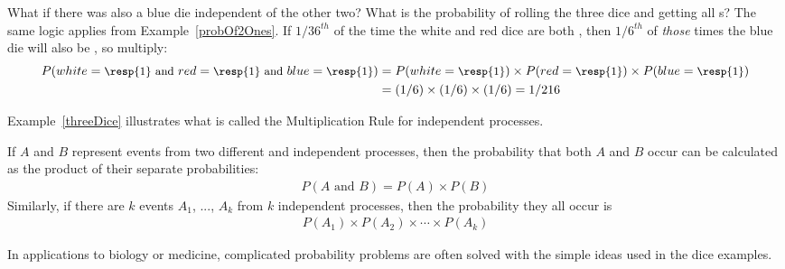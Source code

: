 \begin{example}{What if there was also a blue die independent of the other two? What is the probability of rolling the three dice and getting all s?}\label{threeDice}
The same logic applies from Example~\ref{probOf2Ones}. If $1/36^{th}$ of the time the white and red dice are both , then $1/6^{th}$ of \emph{those} times the blue die will also be , so multiply:
{\begin{align*}
P(white=\text{\small\resp{1} and } red=\text{\small\resp{1} and } blue=\text{\small\resp{1}})
	&= P(white=\text{\small\resp{1}})\times P(red=\text{\small\resp{1}})\times P(blue=\text{\small\resp{1}}) \\
	&= (1/6)\times (1/6)\times (1/6)
	= 1/216
\end{align*}} \vspace{-7mm}
\end{example}

Example~\ref{threeDice} illustrates what is called the Multiplication Rule for independent processes. 

\begin{termBox}{
If $A$ and $B$ represent events from two different and independent processes, then the probability that both $A$ and $B$ occur can be calculated as the product of their separate probabilities: \vspace{-1.5mm}
\begin{eqnarray}\label{eqForIndependentEvents}
P(A \text{ and }B) = P(A) \times  P(B)
\end{eqnarray}
Similarly, if there are $k$ events $A_1$, ..., $A_k$ from $k$ independent processes, then the probability they all occur is\vspace{-1.5mm}
\begin{eqnarray*}
P(A_1) \times  P(A_2)\times  \cdots \times  P(A_k)
\end{eqnarray*}\vspace{-6mm}}
\end{termBox}

In applications to biology or medicine, complicated probability problems are often solved with the simple ideas used in the dice examples.

